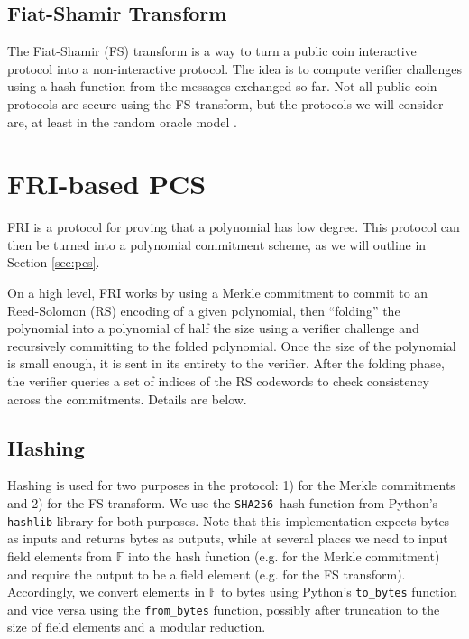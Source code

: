 \documentclass[final]{zamarep}
\newcommand{\field}{\mathbb{F}}
\newcommand{\sha}{\texttt{SHA256}~}
\begin{document}
\subsection{Fiat-Shamir Transform}
\label{sec:fs}

The Fiat-Shamir (FS) transform is a way to turn a public coin interactive protocol into a non-interactive protocol. The idea is to compute verifier challenges using a hash function from the messages exchanged so far. Not all public coin protocols are secure using the FS transform, but the protocols we will consider are, at least in the random oracle model \cite{DBLP:journals/iacr/BlockGKTTZ23}.

\section{FRI-based PCS}
\label{sec:fri}
FRI \cite{ICALP:BBHR18} is a protocol for proving that a polynomial has low degree. This protocol can then be turned into a polynomial commitment scheme, as we will outline in Section \ref{sec:pcs}.

On a high level, FRI works by using a Merkle commitment to commit to an Reed-Solomon (RS) encoding of a given polynomial, then ``folding'' the polynomial into a polynomial of half the size using a verifier challenge and recursively committing to the folded polynomial. Once the size of the polynomial is small enough, it is sent in its entirety to the verifier. After the folding phase, the verifier queries a set of indices of the RS codewords to check consistency across the commitments. Details are below.

\subsection{Hashing}
\label{sec:hash}
Hashing is used for two purposes in the protocol: 1) for the Merkle commitments and 2) for the FS transform. We use the \sha hash function from Python's \verb+hashlib+ library for both purposes. Note that this implementation expects bytes as inputs and returns bytes as outputs, while at several places we need to input field elements from $\field$ into the hash function (e.g. for the Merkle commitment) and require the output to be a field element (e.g. for the FS transform). Accordingly, we convert elements in $\field$ to bytes using Python's \verb+to_bytes+ function and vice versa using the \verb+from_bytes+ function, possibly after truncation to the size of field elements and a modular reduction.
\end{document}
